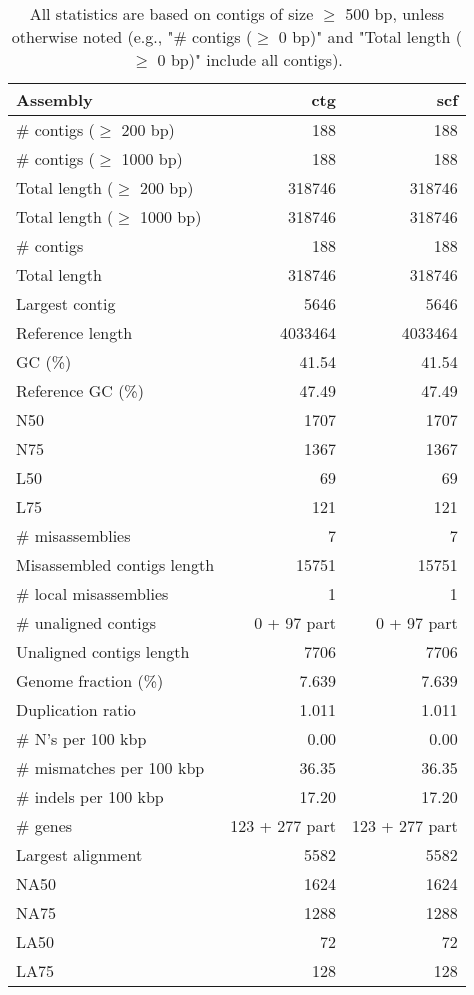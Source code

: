 \documentclass[12pt,a4paper]{article}
\begin{document}
\begin{table}[ht]
\begin{center}
\caption{All statistics are based on contigs of size $\geq$ 500 bp, unless otherwise noted (e.g., "\# contigs ($\geq$ 0 bp)" and "Total length ($\geq$ 0 bp)" include all contigs).}
\begin{tabular}{|l*{2}{|r}|}
\hline
Assembly & ctg & scf \\ \hline
\# contigs ($\geq$ 200 bp) & 188 & 188 \\ \hline
\# contigs ($\geq$ 1000 bp) & 188 & 188 \\ \hline
Total length ($\geq$ 200 bp) & 318746 & 318746 \\ \hline
Total length ($\geq$ 1000 bp) & 318746 & 318746 \\ \hline
\# contigs & 188 & 188 \\ \hline
Total length & 318746 & 318746 \\ \hline
Largest contig & 5646 & 5646 \\ \hline
Reference length & 4033464 & 4033464 \\ \hline
GC (\%) & 41.54 & 41.54 \\ \hline
Reference GC (\%) & 47.49 & 47.49 \\ \hline
N50 & 1707 & 1707 \\ \hline
N75 & 1367 & 1367 \\ \hline
L50 & 69 & 69 \\ \hline
L75 & 121 & 121 \\ \hline
\# misassemblies & 7 & 7 \\ \hline
Misassembled contigs length & 15751 & 15751 \\ \hline
\# local misassemblies & 1 & 1 \\ \hline
\# unaligned contigs & 0 + 97 part & 0 + 97 part \\ \hline
Unaligned contigs length & 7706 & 7706 \\ \hline
Genome fraction (\%) & 7.639 & 7.639 \\ \hline
Duplication ratio & 1.011 & 1.011 \\ \hline
\# N's per 100 kbp & 0.00 & 0.00 \\ \hline
\# mismatches per 100 kbp & 36.35 & 36.35 \\ \hline
\# indels per 100 kbp & 17.20 & 17.20 \\ \hline
\# genes & 123 + 277 part & 123 + 277 part \\ \hline
Largest alignment & 5582 & 5582 \\ \hline
NA50 & 1624 & 1624 \\ \hline
NA75 & 1288 & 1288 \\ \hline
LA50 & 72 & 72 \\ \hline
LA75 & 128 & 128 \\ \hline
\end{tabular}
\end{center}
\end{table}
\end{document}
